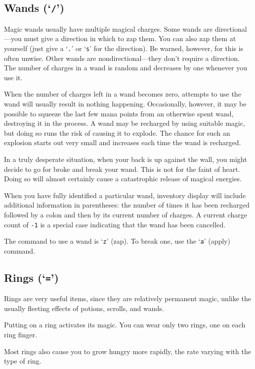 \subsection*{Wands (`{\tt /}')}

Magic wands usually have multiple magical charges.  Some wands are
directional---you must give a direction in which to zap them.  You can also
zap them at yourself (just give a `{\tt .}' or `{\tt s}' for the direction).
Be warned, however, for this is often unwise.  Other wands are
nondirectional---they don't require a direction.  The number of charges in a
wand is random and decreases by one whenever you use it.

When the number of charges left in a wand becomes zero, attempts to use the
wand will usually result in nothing happening.  Occasionally, however, it may
be possible to squeeze the last few mana points from an otherwise spent wand,
destroying it in the process.  A wand may be recharged by using suitable
magic, but doing so runs the risk of causing it to explode.  The chance
for such an explosion starts out very small and increases each time the
wand is recharged.

In a truly desperate situation, when your back is up against the wall, you
might decide to go for broke and break your wand.  This is not for the faint
of heart.  Doing so will almost certainly cause a catastrophic release of
magical energies.

When you have fully identified a particular wand, inventory display will
include additional information in parentheses: the number of times it has
been recharged followed by a colon and then by its current number of charges.
A current charge count of {\tt -1} is a special case indicating that the wand
has been cancelled.

The command to use a wand is `{\tt z}' (zap).  To break one, use the `{\tt a}'
(apply) command.

\subsection*{Rings (`{\tt =}')}

Rings are very useful items, since they are relatively permanent
magic, unlike the usually fleeting effects of potions, scrolls, and
wands.

Putting on a ring activates its magic.  You can wear only two
rings, one on each ring finger.

Most rings also cause you to grow hungry more rapidly, the rate
varying with the type of ring.

